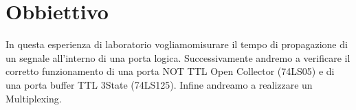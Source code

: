 \section*{Obbiettivo}

In questa esperienza di laboratorio vogliamomisurare il tempo di propagazione di un segnale all'interno di una porta logica. Successivamente andremo a verificare il corretto funzionamento di una porta NOT TTL Open Collector (74LS05) e di una porta buffer TTL 3State (74LS125). Infine andreamo a realizzare un Multiplexing.